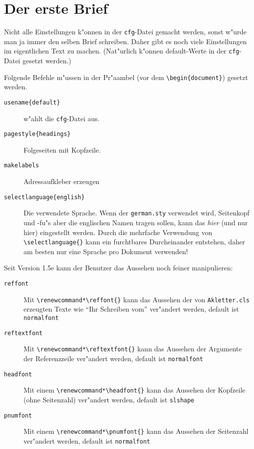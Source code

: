 \documentclass[a4paper]{article}
\begin{document}
\section{Der erste Brief}

Nicht alle Einstellungen k"onnen in der \texttt{cfg}-Datei 
gemacht werden, sonst w"urde man ja immer den selben Brief 
schreiben. Daher gibt es noch viele Einstellungen im 
eigentlichen Text zu machen. (Nat"urlich k"onnen default-Werte in 
der \texttt{cfg}-Datei gesetzt werden.)

Folgende Befehle m"ussen in der Pr"aambel (vor dem 
\verb+\begin{document}+) gesetzt werden.

\begin{description}
\item [\texttt{usename\{default\}}] w"ahlt die \texttt{cfg}-Datei 
	aus.
\item [\texttt{pagestyle\{headings\}}] Folgeseiten mit Kopfzeile.
\item [\texttt{makelabels}] Adressaufkleber erzeugen
\item [\texttt{selectlanguage\{english\}}] Die verwendete 
	Sprache. Wenn der \texttt{german.sty} verwendet wird, 
	Seitenkopf und -fu"s aber die englischen Namen tragen 
	sollen, kann das \emph{hier} (und nur hier) eingestellt 
	werden. Durch die mehrfache Verwendung von 
	\verb+\selectlanguage{}+ kann ein furchtbares 
	Durcheinander entstehen, daher am besten nur eine Sprache pro 
	Dokument verwenden!
\end{description}

Seit Version 1.5e kann der Benutzer das Aussehen noch feiner 
manipulieren:
\begin{description}
	\item[\texttt{reffont}] Mit \verb+\renewcommand*\reffont{}+ kann das 
	Aussehen der von \texttt{Akletter.cls} erzeugten Texte wie "`Ihr 
	Schreiben vom"' ver"andert werden, default ist \texttt{normalfont}

	\item[\texttt{reftextfont}] Mit \verb+\renewcommand*\reftextfont{}+ 
	kann das Aussehen der Argumente der Referenzzeile ver"andert werden,
	default ist \texttt{normalfont}

	\item[\texttt{headfont}] Mit einem 
	\verb+\renewcommand*\headfont{}+ kann das Aussehen der Kopfzeile 
	(ohne Seitenzahl) ver"andert werden, default ist \texttt{slshape}

	\item[\texttt{pnumfont}] Mit einem 
	\verb+\renewcommand*\pnumfont{}+ kann das Aussehen der Seitenzahl 
	ver"andert werden, default ist \texttt{normalfont}
	
\end{description}
\end{document}
